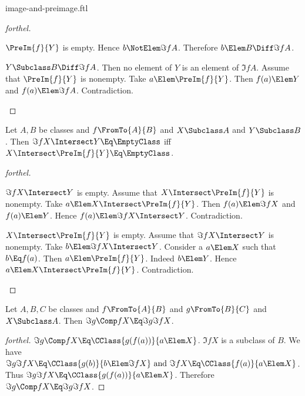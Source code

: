 \documentclass{stex}
\begin{document}
\begin{smodule}{image-and-preimage.ftl}
\begin{proof}[forthel]
\begin{case}{$\PreIm{f}{Y}$ is empty.}
    Hence $b \NotElem \Im{f}{A}$.
    Therefore $b \Elem B \Diff \Im{f}{A}$.
  \end{case}

  \begin{case}{$Y \Subclass B \Diff \Im{f}{A}$.}
    Then no element of $Y$ is an element of $\Im{f}{A}$.
    Assume that $\PreIm{f}{Y}$ is nonempty.
    Take $a \Elem \PreIm{f}{Y}$.
    Then $f(a) \Elem Y$ and $f(a) \Elem \Im{f}{A}$.
    Contradiction.
  \end{case}
\end{proof}

\begin{proposition*}[forthel]
  Let $A, B$ be classes and $f \FromTo{A}{B}$ and $X \Subclass A$ and $Y \Subclass B$.
  Then $\Im{f}{X} \Intersect Y \Eq \EmptyClass$ iff $X \Intersect \PreIm{f}{Y} \Eq \EmptyClass$.
\end{proposition*}
\begin{proof}[forthel]
  \begin{case}{$\Im{f}{X} \Intersect Y$ is empty.}
    Assume that $X \Intersect \PreIm{f}{Y}$ is nonempty.
    Take $a \Elem X \Intersect \PreIm{f}{Y}$.
    Then $f(a) \Elem \Im{f}{X}$ and $f(a) \Elem Y$.
    Hence $f(a) \Elem \Im{f}{X} \Intersect Y$.
    Contradiction.
  \end{case}

  \begin{case}{$X \Intersect \PreIm{f}{Y}$ is empty.}
    Assume that $\Im{f}{X} \Intersect Y$ is nonempty.
    Take $b \Elem \Im{f}{X} \Intersect Y$.
    Consider a $a \Elem X$ such that $b \Eq f(a)$.
    Then $a \Elem \PreIm{f}{Y}$.
    Indeed $b \Elem Y$.
    Hence $a \Elem X \Intersect \PreIm{f}{Y}$.
    Contradiction.
  \end{case}
\end{proof}

\begin{proposition*}[forthel]
  Let $A, B, C$ be classes and $f \FromTo{A}{B}$ and $g \FromTo{B}{C}$ and $X \Subclass A$.
  Then $\Im{g \Comp f}{X} \Eq \Im{g}{\Im{f}{X}}$.
\end{proposition*}
\begin{proof}[forthel]
  $\Im{g \Comp f}{X} \Eq \CClass{g(f(a))}{a \Elem X}$.
  $\Im{f}{X}$ is a subclass of $B$.
  We have $\Im{g}{\Im{f}{X}} \Eq \CClass{g(b)}{b \Elem \Im{f}{X}}\text{ and }\Im{f}{X} \Eq \CClass{f(a)}{a \Elem X}$.
  Thus $\Im{g}{\Im{f}{X}} \Eq \CClass{g(f(a))}{a \Elem X}$.
  Therefore $\Im{g \Comp f}{X} \Eq \Im{g}{\Im{f}{X}}$.
\end{proof}


\end{smodule}
\end{document}
